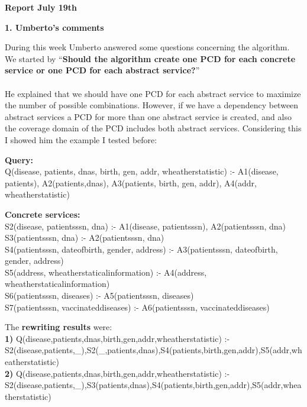\documentclass[12pt,a4paper,oneside]{report}
\begin{document}
\begin{center}
\textbf{\large{Report July 19th}} \\
\end{center}

\begin{flushleft}
\textbf{ 1. Umberto's comments}
\end{flushleft}

During this week Umberto answered some questions concerning the algorithm. We started by ``\textbf{Should the algorithm create one PCD for each concrete service or one PCD for each abstract service?}''
\\
\\
He explained that we should have one PCD for each abstract service to maximize the number of possible combinations. 
However, if we have a dependency between abstract services a PCD for more than one abstract service is created, and also the coverage domain of the PCD includes both abstract services. Considering this I showed him the example I tested before: 

\begin{flushleft}
\textbf{Query:} \\
Q(disease, patients, dnas, birth, gen, addr, wheatherstatistic) :- A1(disease, patients), A2(patients,dnas), A3(patients, birth, gen, addr), A4(addr, wheatherstatistic) \\
\end{flushleft}

\begin{flushleft}
\textbf{Concrete services:} \\
S2(disease, patientsssn, dna) :- A1(disease, patientsssn), A2(patientsssn, dna)\\
S3(patientsssn, dna) :- A2(patientsssn, dna)\\
S4(patientsssn, dateofbirth, gender, address) :- A3(patientsssn, dateofbirth, gender, address)\\
S5(address, wheatherstaticalinformation) :- A4(address, wheatherstaticalinformation)\\
S6(patientsssn, diseases) :- A5(patientsssn, diseases)\\
S7(patientsssn, vaccinateddiseases) :- A6(patientsssn, vaccinateddiseases)\\
\end{flushleft}

\begin{flushleft}
The \textbf{rewriting results} were: \\
\textbf{1) }Q(disease,patients,dnas,birth,gen,addr,wheatherstatistic) :- S2(disease,patients,\_),S2(\_,patients,dnas),S4(patients,birth,gen,addr),S5(addr,wheatherstatistic) \\
\textbf{2) }Q(disease,patients,dnas,birth,gen,addr,wheatherstatistic) :- S2(disease,patients,\_),S3(patients,dnas),S4(patients,birth,gen,addr),S5(addr,wheatherstatistic)
\end{flushleft}
\end{document}
